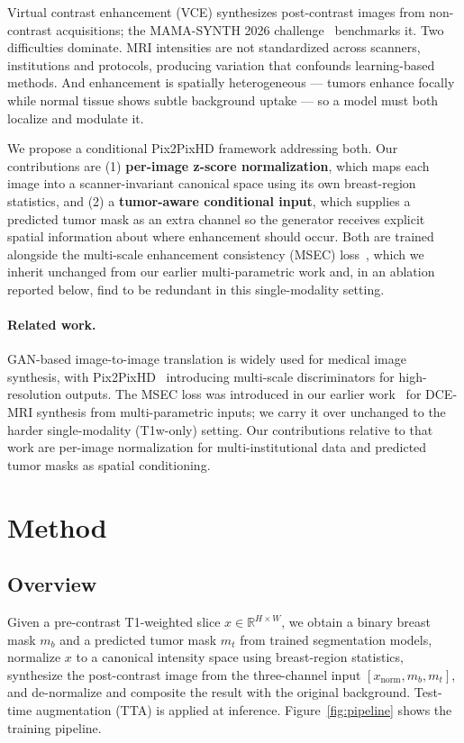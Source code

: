 \documentclass[runningheads,a4paper]{llncs}
\begin{document}
Virtual contrast enhancement (VCE) synthesizes post-contrast images from non-contrast acquisitions; the MAMA-SYNTH 2026 challenge~\cite{mamasynth2026} benchmarks it. Two difficulties dominate. MRI intensities are not standardized across scanners, institutions and protocols, producing variation that confounds learning-based methods. And enhancement is spatially heterogeneous --- tumors enhance focally while normal tissue shows subtle background uptake --- so a model must both localize and modulate it.

We propose a conditional Pix2PixHD framework addressing both. Our contributions are (1) \textbf{per-image z-score normalization}, which maps each image into a scanner-invariant canonical space using its own breast-region statistics, and (2) a \textbf{tumor-aware conditional input}, which supplies a predicted tumor mask as an extra channel so the generator receives explicit spatial information about where enhancement should occur. Both are trained alongside the multi-scale enhancement consistency (MSEC) loss~\cite{yang2026miccai}, which we inherit unchanged from our earlier multi-parametric work and, in an ablation reported below, find to be redundant in this single-modality setting.

\paragraph{Related work.}
GAN-based image-to-image translation is widely used for medical image synthesis, with Pix2PixHD~\cite{wang2018pix2pixHD} introducing multi-scale discriminators for high-resolution outputs. The MSEC loss was introduced in our earlier work~\cite{yang2026miccai} for DCE-MRI synthesis from multi-parametric inputs; we carry it over unchanged to the harder single-modality (T1w-only) setting. Our contributions relative to that work are per-image normalization for multi-institutional data and predicted tumor masks as spatial conditioning.

\section{Method}
\subsection{Overview}
Given a pre-contrast T1-weighted slice $x \in \mathbb{R}^{H \times W}$, we obtain a binary breast mask $m_b$ and a predicted tumor mask $m_t$ from trained segmentation models, normalize $x$ to a canonical intensity space using breast-region statistics, synthesize the post-contrast image from the three-channel input $[x_{\text{norm}}, m_b, m_t]$, and de-normalize and composite the result with the original background. Test-time augmentation (TTA) is applied at inference. Figure~\ref{fig:pipeline} shows the training pipeline.
\end{document}
